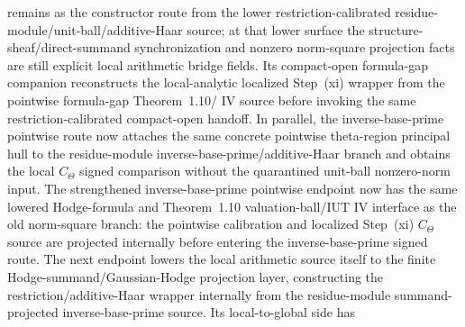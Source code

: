 \begin{proposition}
  remains as the constructor route from the lower restriction-calibrated
  residue-module/unit-ball/additive-Haar source; at that lower surface the
  structure-sheaf/direct-summand synchronization and nonzero norm-square
  projection facts are still explicit local arithmetic bridge fields.
  Its compact-open formula-gap companion
  reconstructs the local-analytic localized Step~(xi) wrapper from the
  pointwise formula-gap Theorem~1.10/\IUT{} IV source before invoking the same
  restriction-calibrated compact-open handoff.
  In parallel, the inverse-base-prime pointwise route
  now attaches the same concrete pointwise theta-region principal hull to the
  residue-module inverse-base-prime/additive-Haar branch and obtains the local
  \(C_\Theta\) signed comparison without the quarantined unit-ball
  nonzero-norm input.  The strengthened inverse-base-prime pointwise endpoint
  now has the same lowered Hodge-formula and Theorem~1.10 valuation-ball/IUT
  IV interface as the old norm-square branch: the pointwise calibration and
  localized Step~(xi) \(C_\Theta\) source are projected internally before
  entering the inverse-base-prime signed route.  The next endpoint
  lowers the local arithmetic source itself to the finite
  Hodge-summand/Gaussian-Hodge projection layer, constructing the
  restriction/additive-Haar wrapper internally from the residue-module
  summand-projected inverse-base-prime source.  Its local-to-global side has

\end{proposition}
